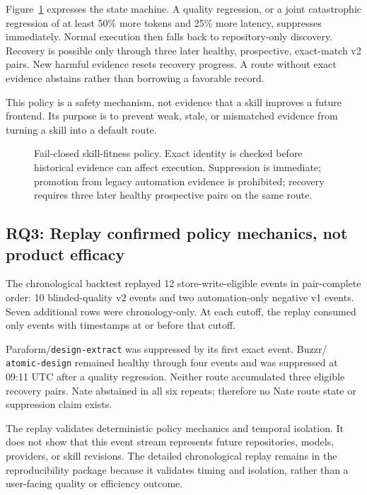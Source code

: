\documentclass[9pt,twocolumn]{extarticle}
\newcommand{\RQ}[1]{\textbf{RQ#1}}
\begin{document}
Figure~\ref{fig:policy} expresses the state machine. A quality regression, or a
joint catastrophic regression of at least 50\% more tokens and 25\% more
latency, suppresses immediately. Normal execution then falls back to
repository-only discovery. Recovery is possible only through three later
healthy, prospective, exact-match v2 pairs. New harmful evidence resets
recovery progress. A route without exact evidence abstains rather than
borrowing a favorable record.

This policy is a safety mechanism, not evidence that a skill improves a future
frontend. Its purpose is to prevent weak, stale, or mismatched evidence from
turning a skill into a default route.

\begin{figure}[t]
\centering
\PolicyFigure
\caption{Fail-closed skill-fitness policy. Exact identity is checked before
historical evidence can affect execution. Suppression is immediate; promotion
from legacy automation evidence is prohibited; recovery requires three later
healthy prospective pairs on the same route.}
\label{fig:policy}
\end{figure}

\subsection{\RQ{3}: Replay confirmed policy mechanics, not product efficacy}

The chronological backtest replayed 12 store-write-eligible events in
pair-complete order: 10 blinded-quality v2 events and two automation-only
negative v1 events. Seven additional rows were chronology-only. At each cutoff,
the replay consumed only events with timestamps at or before that cutoff.

Paraform/\texttt{design-extract} was suppressed by its first exact event. Buzzr/
\texttt{atomic-design} remained healthy through four events and was suppressed
at 09:11 UTC after a quality regression. Neither route accumulated three
eligible recovery pairs. Nate abstained in all six repeats; therefore no Nate
route state or suppression claim exists.

The replay validates deterministic policy mechanics and temporal isolation. It
does not show that this event stream represents future repositories, models,
providers, or skill revisions. The detailed chronological replay remains in
the reproducibility package because it validates timing and isolation, rather
than a user-facing quality or efficiency outcome.
\end{document}
